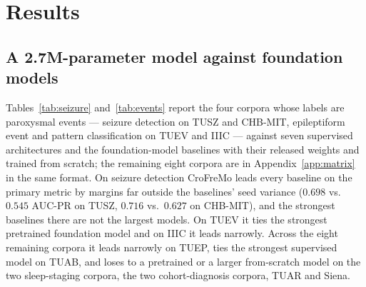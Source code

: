 \section{Results}
\label{sec:results}

\subsection{A 2.7M-parameter model against foundation models}
\label{sec:main}

Tables~\ref{tab:seizure} and~\ref{tab:events} report the four corpora
whose labels are paroxysmal events --- seizure detection on TUSZ and
CHB-MIT, epileptiform event and pattern classification on TUEV and IIIC
--- against seven supervised architectures and the foundation-model
baselines with their released weights and trained from scratch; the
remaining eight corpora are in Appendix~\ref{app:matrix} in the same
format. On seizure detection CroFreMo leads every baseline on the primary
metric by margins far outside the baselines' seed variance ($0.698$
vs.\ $0.545$ AUC-PR on TUSZ, $0.716$ vs.\ $0.627$ on CHB-MIT), and the
strongest baselines there are not the largest models. On TUEV it ties the
strongest pretrained foundation model and on IIIC it leads narrowly.
Across the eight remaining corpora it leads narrowly on TUEP, ties the
strongest supervised model on TUAB, and loses to a pretrained or a larger
from-scratch model on the two sleep-staging corpora, the two
cohort-diagnosis corpora, TUAR and Siena.

